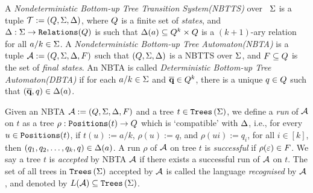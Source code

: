\begin{definition}\label{def:nbta}
    A \emph{Nondeterministic Bottom-up Tree Transition System(NBTTS)} over \rab\ $\Sigma$ is a tuple $\mathcal{T} := (Q, \Sigma, \Delta)$, where $Q$ is a finite set of \emph{states}, and $\Delta : \Sigma \to \texttt{Relations}(Q)$ is such that $\Delta(a) \subseteq Q^k \times Q$ is a $(k+1)$-ary relation for all $a/k \in \Sigma$. A \emph{Nondeterministic Bottom-up Tree Automaton(NBTA)} is a tuple $\mathcal{A} := (Q, \Sigma, \Delta, F)$ such that $(Q, \Sigma, \Delta)$ is a NBTTS over $\Sigma$, and $F \subseteq Q$ is the set of \emph{final states}. An NBTA is called \emph{Deterministic Bottom-up Tree Automaton(DBTA)} if for each $a/k \in \Sigma$ and $\overline{\textbf{q}} \in Q^k$, there is a unique $q \in Q$ such that $(\overline{\textbf{q}}, q) \in \Delta(a)$.
\end{definition}

\begin{definition}\label{def:runAcceptanceNbta}
    Given an NBTA $\mathcal{A} := (Q, \Sigma, \Delta, F)$ and a tree $t \in \texttt{Trees}\left(\Sigma\right)$, we define a \emph{run} of $\mathcal{A}$ on $t$ as a tree $\rho : \texttt{Positions}(t) \to Q$ which is `compatible' with $\Delta$, i.e., for every $u \in \texttt{Positions}(t)$, if $t(u) := a/k$, $\rho(u) := q$, and $\rho(ui) := q_i$, for all $i \in [k]$, then $(q_1, q_2, \dots, q_k, q) \in \Delta(a)$. A run $\rho$ of $\mathcal{A}$ on tree $t$ is \emph{successful} if $\rho(\varepsilon) \in F$. We say a tree $t$ is \emph{accepted} by NBTA $\mathcal{A}$ if there exists a successful run of $\mathcal{A}$ on $t$. The set of all trees in $\texttt{Trees}\left(\Sigma\right)$ accepted by $\mathcal{A}$ is called the language \emph{recognised} by $\mathcal{A}$, and denoted by $L(\mathcal{A}) \subseteq \texttt{Trees}\left(\Sigma\right)$.
\end{definition}


